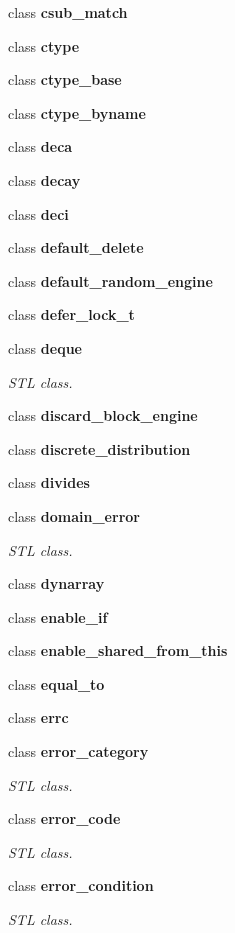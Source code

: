 \begin{DoxyCompactItemize}
\item 
class \textbf{ csub\+\_\+match}
\item 
class \textbf{ ctype}
\item 
class \textbf{ ctype\+\_\+base}
\item 
class \textbf{ ctype\+\_\+byname}
\item 
class \textbf{ deca}
\item 
class \textbf{ decay}
\item 
class \textbf{ deci}
\item 
class \textbf{ default\+\_\+delete}
\item 
class \textbf{ default\+\_\+random\+\_\+engine}
\item 
class \textbf{ defer\+\_\+lock\+\_\+t}
\item 
class \textbf{ deque}
\begin{DoxyCompactList}\small\item\em S\+TL class. \end{DoxyCompactList}\item 
class \textbf{ discard\+\_\+block\+\_\+engine}
\item 
class \textbf{ discrete\+\_\+distribution}
\item 
class \textbf{ divides}
\item 
class \textbf{ domain\+\_\+error}
\begin{DoxyCompactList}\small\item\em S\+TL class. \end{DoxyCompactList}\item 
class \textbf{ dynarray}
\item 
class \textbf{ enable\+\_\+if}
\item 
class \textbf{ enable\+\_\+shared\+\_\+from\+\_\+this}
\item 
class \textbf{ equal\+\_\+to}
\item 
class \textbf{ errc}
\item 
class \textbf{ error\+\_\+category}
\begin{DoxyCompactList}\small\item\em S\+TL class. \end{DoxyCompactList}\item 
class \textbf{ error\+\_\+code}
\begin{DoxyCompactList}\small\item\em S\+TL class. \end{DoxyCompactList}\item 
class \textbf{ error\+\_\+condition}
\begin{DoxyCompactList}\small\item\em S\+TL class. \end{DoxyCompactList}\item 

\end{DoxyCompactItemize}
